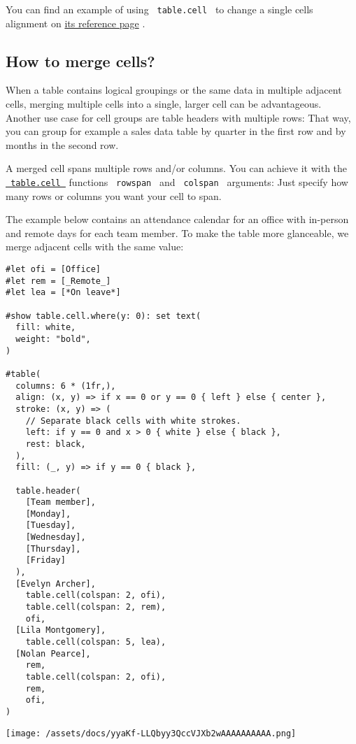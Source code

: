You can find an example of using \texttt{\ table.cell\ } to change a
single cell\textquotesingle s alignment on
\href{/docs/reference/model/table/\#definitions-cell}{its reference
page} .

\subsection{How to merge cells?}\label{merge-cells}

When a table contains logical groupings or the same data in multiple
adjacent cells, merging multiple cells into a single, larger cell can be
advantageous. Another use case for cell groups are table headers with
multiple rows: That way, you can group for example a sales data table by
quarter in the first row and by months in the second row.

A merged cell spans multiple rows and/or columns. You can achieve it
with the
\href{/docs/reference/model/table/\#definitions-cell}{\texttt{\ table.cell\ }}
function\textquotesingle s \texttt{\ rowspan\ } and \texttt{\ colspan\ }
arguments: Just specify how many rows or columns you want your cell to
span.

The example below contains an attendance calendar for an office with
in-person and remote days for each team member. To make the table more
glanceable, we merge adjacent cells with the same value:

\begin{verbatim}
#let ofi = [Office]
#let rem = [_Remote_]
#let lea = [*On leave*]

#show table.cell.where(y: 0): set text(
  fill: white,
  weight: "bold",
)

#table(
  columns: 6 * (1fr,),
  align: (x, y) => if x == 0 or y == 0 { left } else { center },
  stroke: (x, y) => (
    // Separate black cells with white strokes.
    left: if y == 0 and x > 0 { white } else { black },
    rest: black,
  ),
  fill: (_, y) => if y == 0 { black },

  table.header(
    [Team member],
    [Monday],
    [Tuesday],
    [Wednesday],
    [Thursday],
    [Friday]
  ),
  [Evelyn Archer],
    table.cell(colspan: 2, ofi),
    table.cell(colspan: 2, rem),
    ofi,
  [Lila Montgomery],
    table.cell(colspan: 5, lea),
  [Nolan Pearce],
    rem,
    table.cell(colspan: 2, ofi),
    rem,
    ofi,
)
\end{verbatim}

\texttt{[image: /assets/docs/yyaKf-LLQbyy3QccVJXb2wAAAAAAAAAA.png]}

